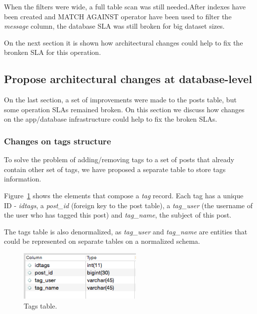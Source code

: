 When the filters were wide, a full table scan was still needed.After indexes have been created and MATCH AGAINST operator have been used to filter the \textit{message} column, the database SLA was still broken for big dataset sizes. 

On the next section it is shown how architectural changes could help to fix the bronken SLA for this operation. 














\clearpage
\subsection{Propose architectural changes at database-level}

On the last section, a set of improvements were made to the posts table, but some operation SLAs remained broken. On this section we discuss how changes on the app/database infrastructure could help to fix the broken SLAs.

\subsubsection{Changes on tags structure}
To solve the problem of adding/removing tags to a set of posts that already contain other set of tags, we have proposed a separate table to store tags information. 

Figure~\ref{fig:tagTable} shows the elements that compose a \textit{tag} record. Each tag has a unique ID - \textit{idtags}, a \textit{post\_id} (foreign key to the post table), a \textit{tag\_user} (the username of the user who has tagged this post) and \textit{tag\_name}, the subject of this post. 

The tags table is also denormalized, as \textit{tag\_user} and \textit{tag\_name} are entities that could be represented on separate tables on a normalized schema.

\begin{figure}[ht!]
\centering
\includegraphics[width=60mm]{tagTable.png}
\caption{Tags table.\label{fig:tagTable}}
\end{figure}

